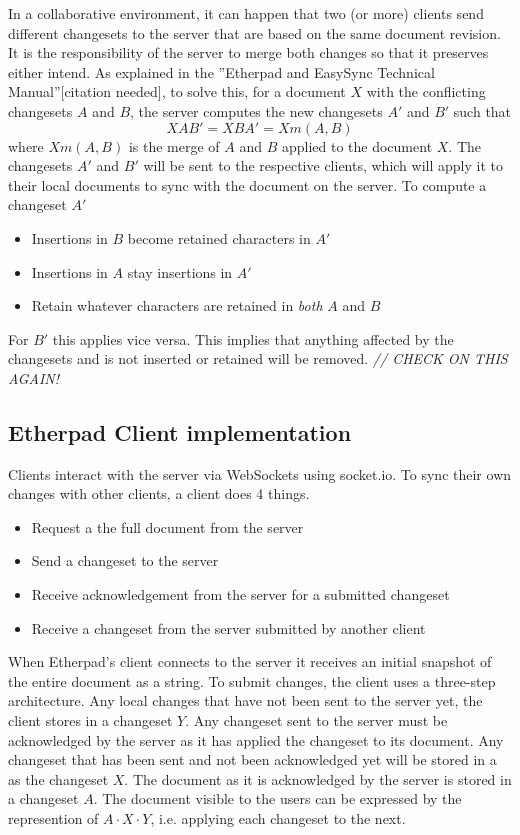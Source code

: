 In a collaborative environment, it can happen that two (or more) clients send different changesets to the server that are based on the same document revision. It is the responsibility of the server to merge both changes so that it preserves either intend. As explained in the ''Etherpad and EasySync Technical Manual''[citation needed], to solve this, for a document $X$ with the conflicting changesets $A$ and $B$, the server computes the new changesets $A'$ and $B'$ such that
$$XAB' = XBA' = Xm(A,B)$$
where $Xm(A,B)$ is the merge of $A$ and $B$ applied to the document $X$. The changesets $A'$ and $B'$ will be sent to the respective clients, which will apply it to their local documents to sync with the document on the server. To compute a changeset $A'$

\begin{itemize}
\item Insertions in $B$ become retained characters in $A'$
\item Insertions in $A$ stay insertions in $A'$
\item Retain whatever characters are retained in \emph{both} $A$ and $B$
\end{itemize}

For $B'$ this applies vice versa. This implies that anything affected by the changesets and is not inserted or retained will be removed. \textit{// CHECK ON THIS AGAIN!}

\subsection{Etherpad Client implementation}

Clients interact with the server via WebSockets using socket.io. To sync their own changes with other clients, a client does 4 things.

\begin{itemize}
\item Request a the full document from the server
\item Send a changeset to the server
\item Receive acknowledgement from the server for a submitted changeset
\item Receive a changeset from the server submitted by another client
\end{itemize}

\noindent When Etherpad's client connects to the server it receives an initial snapshot of the entire document as a string. To submit changes, the client uses a three-step architecture. Any local changes that have not been sent to the server yet, the client stores in a changeset $Y$. Any changeset sent to the server must be acknowledged by the server as it has applied  the changeset to its document. Any changeset that has been sent and not been acknowledged yet will be stored in a as the changeset $X$. The document as it is acknowledged by the server is stored in a changeset $A$. The document visible to the users can be expressed by the represention of $A \cdot X \cdot Y$, i.e. applying each changeset to the next.

